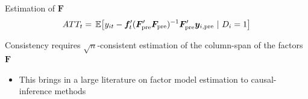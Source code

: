 \documentclass[aspectratio=169,t,11pt]{beamer}
\begin{document}
% 
%   
% 
% 
% 

\begin{frame}{Estimation of $\bm{F}$}
  \vspace{-7.5mm}
  $$
    ATT_t = \expec{%
      y_{it} - \bm{f}_t' (\bm{F}_{\text{pre}}' \bm{F}_{\text{pre}})^{-1} \bm{F}_{\text{pre}}' \bm y_{i, \text{pre} } 
    }{D_i = 1} 
  $$

  \bigskip
  Consistency requires $\sqrt{n}$-consistent estimation of the column-span of the factors $\bm{F}$

  \smallskip
  \begin{itemize}
    \item This brings in a large literature on factor model estimation to causal-inference methods
    
  \end{itemize}
\end{frame}
\end{document}
